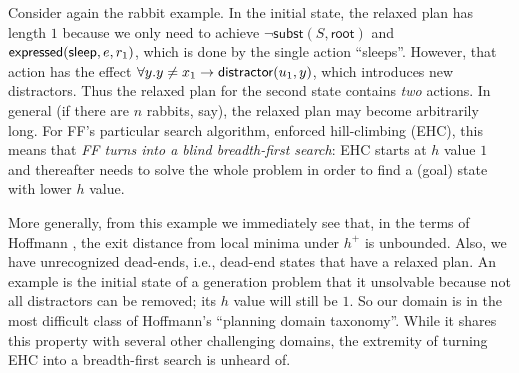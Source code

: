 Consider again the rabbit example. In the initial state, the relaxed
plan has length $1$ because we only need to achieve $\neg
\mathsf{subst}(S,\mathsf{root})$ and $\mathsf{expressed}(\mathsf{sleep},e,r_1)$,
which is done by the single action ``sleeps''. However, that action
has the effect $\forall y. y \neq x_1 \rightarrow
\mathsf{distractor}(u_1,y)$, which introduces new distractors. Thus the
relaxed plan for the second state contains \emph{two} actions. In
general (if there are $n$ rabbits, say), the relaxed plan may become
arbitrarily long.
For FF's particular search algorithm, enforced hill-climbing (EHC),
this means that {\em FF turns into a blind breadth-first search}: EHC
starts at $h$ value $1$ and thereafter needs to solve the whole
problem in order to find a (goal) state with lower $h$ value.




More generally, from this example we immediately see that, in the
terms of Hoffmann , the exit distance from
local minima under $h^+$ is unbounded. Also, we have unrecognized
dead-ends, i.e., dead-end states that have a relaxed plan. An example
is the initial state of a generation problem that it unsolvable
because not all distractors can be removed; its $h$ value will still
be $1$. So our domain is in the most difficult class of Hoffmann's
 ``planning domain taxonomy''. While it
shares this property with several other challenging domains, the
extremity of turning EHC into a breadth-first search is unheard of.


